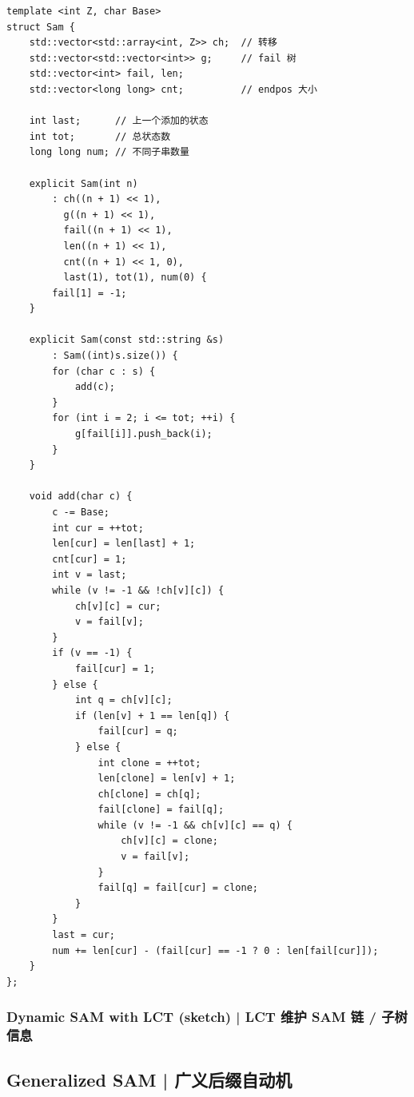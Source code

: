     \begin{lstlisting}
template <int Z, char Base>
struct Sam {
    std::vector<std::array<int, Z>> ch;  // 转移
    std::vector<std::vector<int>> g;     // fail 树
    std::vector<int> fail, len;
    std::vector<long long> cnt;          // endpos 大小

    int last;      // 上一个添加的状态
    int tot;       // 总状态数
    long long num; // 不同子串数量

    explicit Sam(int n)
        : ch((n + 1) << 1),
          g((n + 1) << 1),
          fail((n + 1) << 1),
          len((n + 1) << 1),
          cnt((n + 1) << 1, 0),
          last(1), tot(1), num(0) {
        fail[1] = -1;
    }

    explicit Sam(const std::string &s)
        : Sam((int)s.size()) {
        for (char c : s) {
            add(c);
        }
        for (int i = 2; i <= tot; ++i) {
            g[fail[i]].push_back(i);
        }
    }

    void add(char c) {
        c -= Base;
        int cur = ++tot;
        len[cur] = len[last] + 1;
        cnt[cur] = 1;
        int v = last;
        while (v != -1 && !ch[v][c]) {
            ch[v][c] = cur;
            v = fail[v];
        }
        if (v == -1) {
            fail[cur] = 1;
        } else {
            int q = ch[v][c];
            if (len[v] + 1 == len[q]) {
                fail[cur] = q;
            } else {
                int clone = ++tot;
                len[clone] = len[v] + 1;
                ch[clone] = ch[q];
                fail[clone] = fail[q];
                while (v != -1 && ch[v][c] == q) {
                    ch[v][c] = clone;
                    v = fail[v];
                }
                fail[q] = fail[cur] = clone;
            }
        }
        last = cur;
        num += len[cur] - (fail[cur] == -1 ? 0 : len[fail[cur]]);
    }
};
    \end{lstlisting}

    \subsubsection{Dynamic SAM with LCT (sketch) | LCT 维护 SAM 链 / 子树信息}


\subsection{Generalized SAM | 广义后缀自动机}

